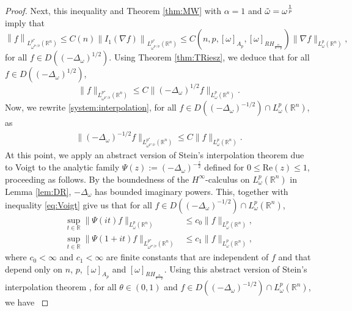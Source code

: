 \documentclass[12pt, letterpaper]{amsart}
\theoremstyle{definition}
\theoremstyle{remark}
\numberwithin{equation}{section}
\begin{document}
{\begin{proof}
{   Next, this inequality and Theorem \ref{thm:MW} with $\alpha=1$ and $\Tilde{\omega}=\omega^{\frac{1}{p}}$  imply that
    \begin{equation*}
        \left\| f\right\|_{L^{p^\star}_{\omega^{p^\star/p}}(\mathbb{R}^n)} \leq C(n) \left\| I_1(\nabla f)\right\|_{L^{p^\star}_{\omega^{p^\star/p}}(\mathbb{R}^n)}\leq {C( n,p,[\omega]_{A_p},[\omega]_{RH_{\frac{n}{n-p}}} )}  \|\nabla f \|_{L^p_\omega(\mathbb{R}^n)},
    \end{equation*}
    for all $f \in D((-\Delta_\omega)^{1/2})$. Using Theorem \ref{thm:TRiesz}, we deduce that for all $f \in D((-\Delta_\omega)^{1/2})$,
    \begin{equation}\label{system:interpolation}
        \| f \|_{L^{p^\star}_{\omega^{p^\star/p}}(\mathbb{R}^n)} \leq C  \|(-\Delta_\omega)^{1/2} f \|_{L^p_\omega(\mathbb{R}^n)}.
    \end{equation} 
    Now, we rewrite \eqref{system:interpolation}, for all $f \in D((-\Delta_\omega)^{-1/2}) \cap L^p_\omega(\mathbb{R}^n)$, as
    \begin{align}\label{eq:Voigt}
       \| (-\Delta_\omega)^{-1/2} f \|_{L^{p^\star}_{\omega^{p^\star/p}}(\mathbb{R}^n)} \leq C  \| f \|_{L^p_\omega(\mathbb{R}^n)}.
     \end{align} 
   At this point,  we apply an abstract version of Stein's interpolation theorem due to Voigt \cite{Voigt1992} to the analytic family $\Psi(z) := (-\Delta_\omega)^{-\frac{z}{2}}$ defined for $0 \le \mathrm{Re}(z) \le 1$, proceeding as follows.
   By the boundedness of the $H^\infty$-calculus on $L^p_\omega(\mathbb{R}^n)$ in Lemma \ref{lem:DR}, $-\Delta_\omega$ has bounded imaginary powers. {This, together with inequality \eqref{eq:Voigt}}
   give us that for all $f\in D((-\Delta_\omega)^{-1/2}) \cap L^p_\omega(\mathbb{R}^n)$, 
    \begin{align*}  
        \sup_{t\in \mathbb{R}}\|  \Psi(it)f \|_{L^p_\omega(\mathbb{R}^n)} &
        \le c_0 \| f \|_{L^p_\omega(\mathbb{R}^n)},
   \\
   \sup_{t\in \mathbb{R}} \|  \Psi(1+it)f \|_{L^{p^\star}_{\omega^{p^\star/p}}(\mathbb{R}^n)} &
   \leq c_1 \| f \|_{L^p_\omega(\mathbb{R}^n)},
    \end{align*}
    where $c_0<\infty$ and $c_1<\infty$ are finite constants that are independent of $f$ and  that depend only on $n$, $p$, $[\omega]_{A_p}$ and $[\omega]_{RH_{\frac{n}{n-p}}}$. Using this abstract version of Stein's interpolation theorem \cite{Voigt1992}, for all $\theta \in (0,1)$ and $f\in D((-\Delta_\omega)^{-1/2}) \cap L^p_\omega(\mathbb{R}^n)$, we have 
}
\end{proof}}
\end{document}
